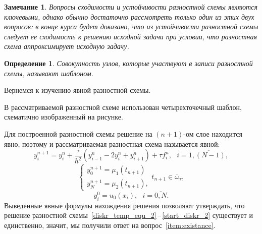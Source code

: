 \documentclass[11pt,a4paper,twoside,listtotoc,bibtotoc]{report}
\numberwithin{equation}{section}
\newtheorem*{definition}{Определение}
\theoremstyle{definition}
\theoremstyle{plain}
\newtheorem*{note*}{Замечание}
\begin{document}
%
\begin{note*}
%
    Вопросы сходимости и устойчивости разностной схемы
    являются ключевыми, однако обычно достаточно рассмотреть только
    один из этих двух вопросов: в конце курса будет доказано, что из устойчивости
    разностной схемы следует ее сходимость к решению исходной задачи при условии,
    что разностная схема аппроксимирует исходную задачу.
%
\end{note*}
%

%
\begin{definition}
%
    Совокупность узлов, которые участвуют в записи разностной схемы, называют шаблоном.
%
\end{definition}
%
Вернемся к изучению явной разностной схемы.

В рассматриваемой разностной схеме использован четырехточечный шаблон, схематично
изображенный на рисунке.

\begin{figure}[H]
\centering
{}
\end{figure}
%

Для построенной разностной схемы решение на $(n+1)$-ом слое находится явно,
поэтому и рассматриваемая разностная схема называется явной:
%
$$
    y_i^{n+1} = y_i^n + \dfrac{\tau}{h^2} (y_{i-1}^n - 2y_i^n + y_{i+1}^n) +
    \tau f_i^n,~~~i = \overline{1, (N - 1),}
$$
%
$$
  \begin{cases}
    y_0^{n+1} = \mu_1(t_{n+1}) \\
    y_N^{n+1} = \mu_2(t_{n+1}),
  \end{cases}
  t_{n+1}\in \overline{\omega}_{\tau},
$$
%
$$
    y_i^0 = u_0(x_i),~~~i=\overline{0,N}.
$$
%
Выведенные явные формулы нахождения решения позволяют утверждать,
что решение разностной схемы~\eqref{diskr_temp_equ_2}\,--\,\eqref{start_diskr_2}
существует и единственно, значит, мы получили ответ
на вопрос~\eqref{item:existance}.
\end{document}
